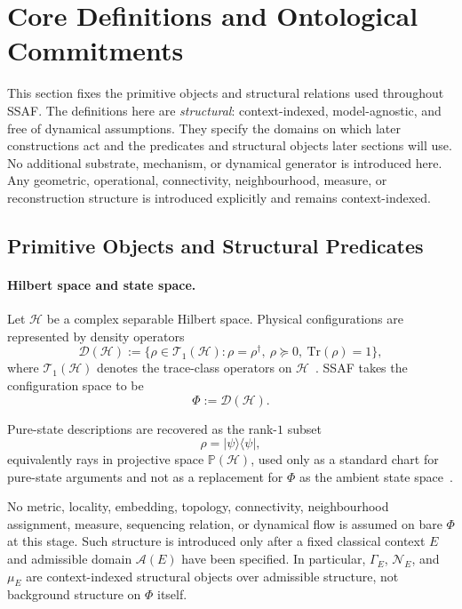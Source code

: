 \documentclass[aps,prx,onecolumn,11pt]{revtex4-2}
\theoremstyle{plain}
\theoremstyle{definition}
\theoremstyle{remark}
\begin{document}
\section{Core Definitions and Ontological Commitments}
\label{sec:core_definitions}

This section fixes the primitive objects and structural relations used
throughout SSAF. The definitions here are \emph{structural}:
context-indexed, model-agnostic, and free of dynamical assumptions.
They specify the domains on which later constructions act and the
predicates and structural objects later sections will use. No additional
substrate, mechanism, or dynamical generator is introduced here.
Any geometric, operational, connectivity, neighbourhood, measure, or
reconstruction structure is introduced explicitly and remains
context-indexed.

\subsection{Primitive Objects and Structural Predicates}
\label{subsec:core_defs_objects}

\paragraph{Hilbert space and state space.}
Let $\mathcal{H}$ be a complex separable Hilbert space. Physical
configurations are represented by density operators
\[
\mathcal{D}(\mathcal{H}) :=
\bigl\{\rho \in \mathcal{T}_1(\mathcal{H})
: \rho = \rho^\dagger,\ \rho \succeq 0,\ \mathrm{Tr}(\rho)=1
\bigr\},
\]
where $\mathcal{T}_1(\mathcal{H})$ denotes the trace-class operators on
$\mathcal{H}$~\cite{Watrous2018}. SSAF takes the configuration space to be
\begin{equation}
\Phi := \mathcal{D}(\mathcal{H}).
\label{eq:phi_def}
\end{equation}

Pure-state descriptions are recovered as the rank-$1$ subset
\[
\rho = |\psi\rangle\langle\psi|,
\]
equivalently rays in projective space $\mathbb{P}(\mathcal{H})$, used
only as a standard chart for pure-state arguments and not as a
replacement for $\Phi$ as the ambient state
space~\cite{Watrous2018,NielsenChuang2010}.

No metric, locality, embedding, topology, connectivity, neighbourhood
assignment, measure, sequencing relation, or dynamical flow is assumed
on bare $\Phi$ at this stage. Such structure is introduced only after a
fixed classical context $E$ and admissible domain $\mathcal A(E)$ have
been specified. In particular, $\Gamma_E$, $\mathcal N_E$, and $\mu_E$
are context-indexed structural objects over admissible structure, not
background structure on $\Phi$ itself.
\end{document}
